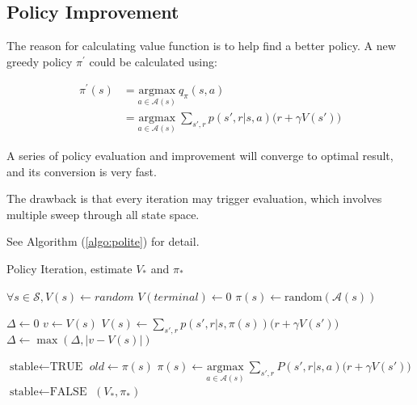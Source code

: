 \subsection{Policy Improvement}

The reason for calculating value function is to help find a better policy. A new greedy policy $\pi^{\prime}$ could be calculated using:

\begin{equation}
	\begin{aligned}
		\pi^{\prime}(s) &= \underset{a \in \mathcal{A}(s)}{\text{argmax}} \ q_{\pi}(s,a)\\
		&=\underset{a \in \mathcal{A}(s)}{\text{argmax}}\ \sum_{s',r} p(s',r|s,a)\Big ( r+\gamma V(s') \Big )
	\end{aligned}
\end{equation}

A series of policy evaluation and improvement will converge to optimal result, and its conversion is very fast. 

The drawback is that every iteration may trigger evaluation, which involves multiple sweep through all state space.

See Algorithm (\ref{algo:polite}) for detail.


\begin{algorithm}
	\caption{Policy Iteration, estimate $V_*$ and $\pi_*$}\label{algo:polite}
	
	\begin{algorithmic}[1]
		\State $\forall s \in \mathcal{S}, V(s) \gets random$
		\State $V(terminal) \gets 0$
		\State $\pi(s) \gets \text{random}(\mathcal{A}(s))$
		
		\Statex
		
			\Repeat
				\State $\Delta \gets 0$
					\State $v \gets V(s)$
					\State $V(s) \gets \sum\limits_{s',r} p(s',r|s,\pi(s))\big (r+\gamma V(s') \big )$ 
					\State $\Delta \gets \max (\Delta, |v - V(s)|)$
				\EndFor
			\Until{$\Delta < \varepsilon$}
		\EndProcedure
		
		\Statex
		
			\State $\text{stable} \gets \text{TRUE}$
				\State $old \gets \pi(s)$
				\State $\pi(s) \gets \underset{a \in \mathcal{A}(s)}{\text{argmax}}\ \sum\limits_{s',r}P(s',r|s,a) \big (r+\gamma V(s') \big )$
					\State $\text{stable} \gets \text{FALSE}$
				\EndIf
			\EndFor
				\Return $(V_*,\pi_*)$
			\Else
				\State {} 
			\EndIf
		\EndProcedure
	\end{algorithmic}
\end{algorithm}

